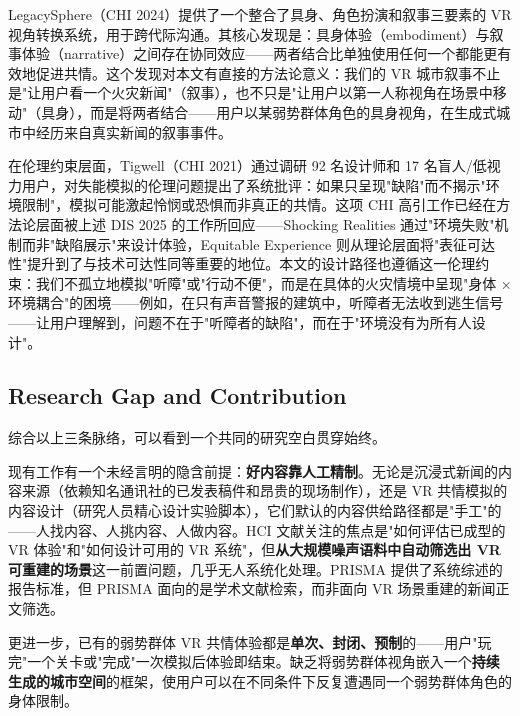 LegacySphere（CHI 2024）提供了一个整合了具身、角色扮演和叙事三要素的 VR 视角转换系统，用于跨代际沟通。其核心发现是：具身体验（embodiment）与叙事体验（narrative）之间存在协同效应——两者结合比单独使用任何一个都能更有效地促进共情\cite{legacysphere2024}。这个发现对本文有直接的方法论意义：我们的 VR 城市叙事不止是"让用户看一个火灾新闻"（叙事），也不只是"让用户以第一人称视角在场景中移动"（具身），而是将两者结合——用户以某弱势群体角色的具身视角，在生成式城市中经历来自真实新闻的叙事事件。

在伦理约束层面，Tigwell（CHI 2021）通过调研 92 名设计师和 17 名盲人/低视力用户，对失能模拟的伦理问题提出了系统批评：如果只呈现"缺陷"而不揭示"环境限制"，模拟可能激起怜悯或恐惧而非真正的共情\cite{tigwell2021}。这项 CHI 高引工作已经在方法论层面被上述 DIS 2025 的工作所回应——Shocking Realities 通过"环境失败"机制而非"缺陷展示"来设计体验\cite{shockingrealities2025}，Equitable Experience 则从理论层面将"表征可达性"提升到了与技术可达性同等重要的地位\cite{equitable2025}。本文的设计路径也遵循这一伦理约束：我们不孤立地模拟"听障"或"行动不便"，而是在具体的火灾情境中呈现"身体 × 环境耦合"的困境——例如，在只有声音警报的建筑中，听障者无法收到逃生信号——让用户理解到，问题不在于"听障者的缺陷"，而在于"环境没有为所有人设计"。

\subsection{Research Gap and Contribution}

综合以上三条脉络，可以看到一个共同的研究空白贯穿始终。

现有工作有一个未经言明的隐含前提：\textbf{好内容靠人工精制}。无论是沉浸式新闻的内容来源（依赖知名通讯社的已发表稿件\cite{delapena2010immersive}和昂贵的现场制作\cite{embracing2024}），还是 VR 共情模拟的内容设计（研究人员精心设计实验脚本\cite{shockingrealities2025}\cite{visualimpairment2025}\cite{legacysphere2024}），它们默认的内容供给路径都是"手工"的——人找内容、人挑内容、人做内容。HCI 文献关注的焦点是"如何评估已成型的 VR 体验"\cite{beyondbeingthere2026}和"如何设计可用的 VR 系统"\cite{recitkit2025}，但\textbf{从大规模噪声语料中自动筛选出 VR 可重建的场景}这一前置问题，几乎无人系统化处理。PRISMA 提供了系统综述的报告标准，但 PRISMA 面向的是学术文献检索，而非面向 VR 场景重建的新闻正文筛选\cite{page2021prisma}。

更进一步，已有的弱势群体 VR 共情体验都是\textbf{单次、封闭、预制}的——用户"玩完"一个关卡\cite{shockingrealities2025}或"完成"一次模拟\cite{visualimpairment2025}后体验即结束。缺乏将弱势群体视角嵌入一个\textbf{持续生成的城市空间}的框架，使用户可以在不同条件下反复遭遇同一个弱势群体角色的身体限制。

